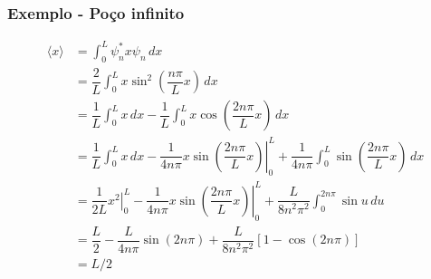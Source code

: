 \documentclass[12pt,brazil,table]{beamer}
\begin{document}

\begin{frame}
  \frametitle{Exemplo - Poço infinito}  
  \fontsize{9pt}{11pt}\selectfont
  
  \begin{align*}
    \langle x \rangle& = \int_0^L \psi_n^* x \psi_n\,dx\\
              &= \dfrac{2}{L}\int_0^L x\sin^2 \left( \dfrac{n\pi}{L}x \right)\,dx\\
              &=\dfrac{1}{L}\int_0^L x\, dx - \dfrac{1}{L}\int_0^L x\cos\left( \dfrac{2n\pi}{L}x \right)\,dx\\
              &=\dfrac{1}{L}\int_0^L x\, dx - \left. \dfrac{1}{4n\pi}x\sin\left( \dfrac{2n\pi}{L}x \right) \right|_0^L + \dfrac{1}{4n\pi}\int_0^L\sin\left( \dfrac{2n\pi}{L}x \right)\,dx\\
            &=\dfrac{1}{2L}\left. x^2\right|_0^L - \left. \dfrac{1}{4n\pi}x\sin\left( \dfrac{2n\pi}{L}x \right) \right|_0^L + \dfrac{L}{8n^2\pi^2}\int_0^{2n\pi}\sin u\,du\\
            &= \dfrac{L}{2} - \dfrac{L}{4n\pi}\sin\left(2n\pi\right)+\dfrac{L}{8n^2\pi^2}\left[ 1 -\cos\left( 2n\pi \right) \right]\\
            &= L/2
  \end{align*}
  
\end{frame}



\end{document}
